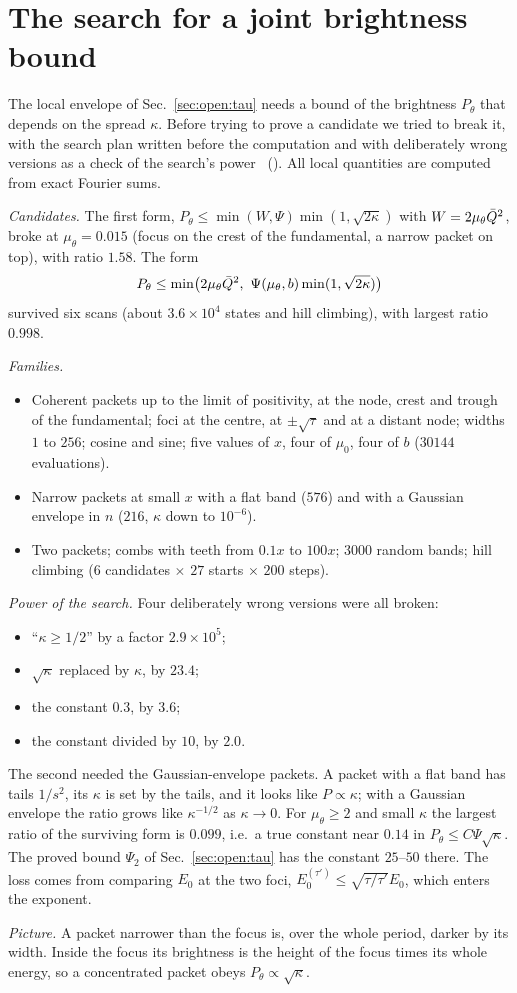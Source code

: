 \section{The search for a joint brightness bound}
\label{app:joint}

The local envelope of Sec.~\ref{sec:open:tau} needs a bound of the brightness $P_\theta$ that depends on the spread $\kappa$.
Before trying to prove a candidate we tried to break it, with the search plan written before the computation and with deliberately wrong versions as a check of the search's power \numst\ ().
All local quantities are computed from exact Fourier sums.

\emph{Candidates.}
The first form, $P_\theta\le\min(W,\Psi)\min(1,\sqrt{2\kappa})$ with $W=2\mu_\theta\bar Q^2$, broke at $\mu_\theta=0.015$ (focus on the crest of the fundamental, a narrow packet on top), with ratio $1.58$.
The form
\begin{equation}
P_\theta\le\min\bigl(2\mu_\theta\Qb^2,\ \Psi(\mu_\theta,b)\min(1,\sqrt{2\kappa})\bigr)
\end{equation}
survived six scans (about $3.6\times10^4$ states and hill climbing), with largest ratio $0.998$.

\emph{Families.}
\begin{itemize}
\item Coherent packets up to the limit of positivity, at the node, crest and trough of the fundamental; foci at the centre, at $\pm\sqrt\tau$ and at a distant node; widths $1$ to $256$; cosine and sine; five values of $x$, four of $\mu_0$, four of $b$ ($30144$ evaluations).
\item Narrow packets at small $x$ with a flat band ($576$) and with a Gaussian envelope in $n$ ($216$, $\kappa$ down to $10^{-6}$).
\item Two packets; combs with teeth from $0.1x$ to $100x$; $3000$ random bands; hill climbing ($6$ candidates $\times$ $27$ starts $\times$ $200$ steps).
\end{itemize}

\emph{Power of the search.}
Four deliberately wrong versions were all broken:
\begin{itemize}
\item ``$\kappa\ge1/2$'' by a factor $2.9\times10^{5}$;
\item $\sqrt\kappa$ replaced by $\kappa$, by $23.4$;
\item the constant $0.3$, by $3.6$;
\item the constant divided by $10$, by $2.0$.
\end{itemize}
The second needed the Gaussian-envelope packets.
A packet with a flat band has tails $1/s^2$, its $\kappa$ is set by the tails, and it looks like $P\propto\kappa$; with a Gaussian envelope the ratio grows like $\kappa^{-1/2}$ as $\kappa\to0$.
For $\mu_\theta\ge2$ and small $\kappa$ the largest ratio of the surviving form is $0.099$, i.e.\ a true constant near $0.14$ in $P_\theta\le C\Psi\sqrt\kappa$.
The proved bound $\Psi_2$ of Sec.~\ref{sec:open:tau} has the constant $25$--$50$ there.
The loss comes from comparing $E_0$ at the two foci, $E_0^{(\tau')}\le\sqrt{\tau/\tau'}E_0$, which enters the exponent.

\emph{Picture.} A packet narrower than the focus is, over the whole period, darker by its width.
Inside the focus its brightness is the height of the focus times its whole energy, so a concentrated packet obeys $P_\theta\propto\sqrt\kappa$.
